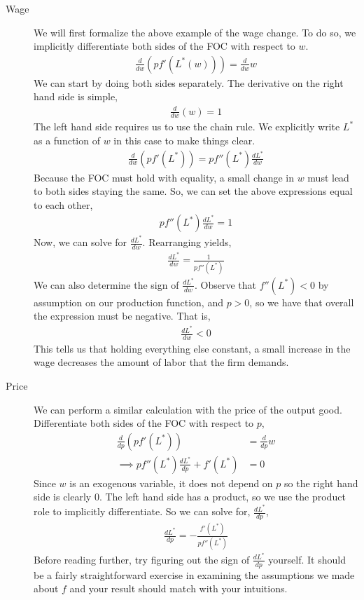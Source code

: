 \begin{description}
    \item[Wage] We will first formalize the above example of the wage change. To do so, we implicitly differentiate both sides of the FOC with respect to $w$. 
    \begin{align*}
            \frac{d}{dw} \left(p f'(L^*(w))\right) = \frac{d}{dw} w
    \end{align*}
    We can start by doing both sides separately. The derivative on the right hand side is simple, 
    \begin{align*}
        \frac{d}{dw}(w) = 1
    \end{align*} 
    The left hand side requires us to use the chain rule. We explicitly write $L^*$ as a function of $w$ in this case to make things clear.
    \begin{align*}
        \frac{d}{dw} \left(p f'(L^*)\right) = p f''(L^*) \frac{dL^*}{dw}
    \end{align*}
    Because the FOC must hold with equality, a small change in $w$ must lead to both sides staying the same. So, we can set the above expressions equal to each other,
    \begin{align*}
        p f''(L^*) \frac{dL^*}{dw} = 1
    \end{align*}
    Now, we can solve for $\frac{dL^*}{dw}$. Rearranging yields,
    \begin{align*}
        \frac{dL^*}{dw} = \frac{1}{p f''(L^*)}
    \end{align*}
    We can also determine the sign of $\frac{dL^*}{dw}$. Observe that $f''(L^*) < 0$ by assumption on our production function, and $p > 0$, so we have that overall the expression must be negative. That is,
    \begin{align*}
        \frac{dL^*}{dw} < 0
    \end{align*}
    This tells us that holding everything else constant, a small increase in the wage decreases the amount of labor that the firm demands. 

    \item[Price] We can perform a similar calculation with the price of the output good. Differentiate both sides of the FOC with respect to $p$,
    \begin{align*}
        \frac{d}{dp} \left(p f'(L^*)\right) &= \frac{d}{dp} w \\
        \implies p f''(L^*) \frac{d L^*}{dp} + f'(L^*) &= 0
    \end{align*} 
    Since $w$ is an exogenous variable, it does not depend on $p$ so the right hand side is clearly 0. The left hand side has a product, so we use the product role to implicitly differentiate. So we can solve for, $\frac{dL^*}{dp}$,
    \begin{align*}
        \frac{dL^*}{dp} = -\frac{f'(L^*)}{p f''(L^*)}
    \end{align*}
    Before reading further, try figuring out the sign of $\frac{dL^*}{dp}$ yourself. It should be a fairly straightforward exercise in examining the assumptions we made about $f$ and your result should match with your intuitions.


\end{description}
